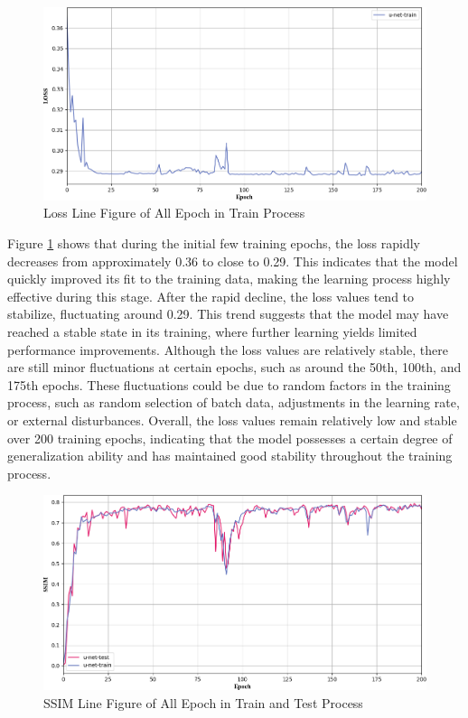 \documentclass[twocolumn]{article}
\begin{document}
\begin{figure}[h]
	\centering
	\includegraphics[width=1.0\linewidth]{u-net/LOSS}
	\caption[loss_train]{Loss Line Figure of All Epoch in Train Process}
	\label{fig:loss_train}
\end{figure}

Figure \ref{fig:loss_train} shows that during the initial few training epochs, the loss rapidly decreases from approximately 0.36 to close to 0.29. This indicates that the model quickly improved its fit to the training data, making the learning process highly effective during this stage. After the rapid decline, the loss values tend to stabilize, fluctuating around 0.29. This trend suggests that the model may have reached a stable state in its training, where further learning yields limited performance improvements. Although the loss values are relatively stable, there are still minor fluctuations at certain epochs, such as around the 50th, 100th, and 175th epochs. These fluctuations could be due to random factors in the training process, such as random selection of batch data, adjustments in the learning rate, or external disturbances. Overall, the loss values remain relatively low and stable over 200 training epochs, indicating that the model possesses a certain degree of generalization ability and has maintained good stability throughout the training process.


\begin{figure}[h]
	\centering
	\includegraphics[width=1.0\linewidth]{u-net/SSIM}
	\caption[ssim]{SSIM Line Figure of All Epoch in Train and Test Process}
	\label{fig:ssim}
\end{figure}
\end{document}
